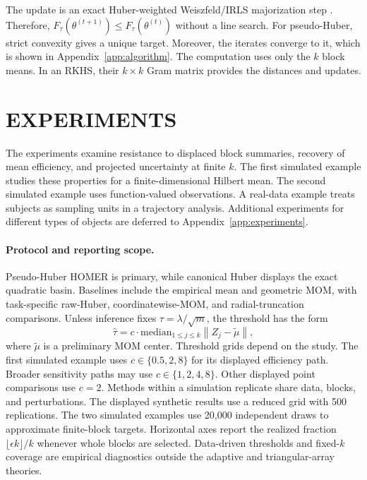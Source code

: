 \documentclass[twoside]{article}
\theoremstyle{definition}
\newcommand{\norm}[1]{\left\lVert #1\right\rVert}
\begin{document}
The update is an exact Huber-weighted Weiszfeld/IRLS majorization step \citep{beck_2015_WeiszfeldsMethodOld,cardot_2013_EfficientFastEstimation}. Therefore, $F_\tau(\theta^{(t+1)})\le F_\tau(\theta^{(t)})$ without a line search. For pseudo-Huber, strict convexity gives a unique target. Moreover, the iterates converge to it, which is shown in Appendix~\ref{app:algorithm}. The computation uses only the $k$ block means. In an RKHS, their $k\times k$ Gram matrix provides the distances and updates. 






\section{EXPERIMENTS}\label{sec:experiments}

The experiments examine resistance to displaced block summaries, recovery of mean efficiency, and projected uncertainty at finite $k$. The first simulated example studies these properties for a finite-dimensional Hilbert mean. The second simulated example uses function-valued observations. A real-data example treats subjects as sampling units in a trajectory analysis. Additional experiments for different types of objects are deferred to Appendix~\ref{app:experiments}.

\paragraph{Protocol and reporting scope.}
Pseudo-Huber HOMER is primary, while canonical Huber displays the exact quadratic basin. Baselines include the empirical mean and geometric MOM, with task-specific raw-Huber, coordinatewise-MOM, and radial-truncation comparisons. Unless inference fixes $\tau=\lambda/\sqrt m$, the threshold has the form
\[
    \hat\tau=c\cdot \mathrm{median}_{1\le j\le k}\norm{Z_j-\tilde\mu},
\]
where $\tilde\mu$ is a preliminary MOM center. Threshold grids depend on the study. The first simulated example uses $c\in\{0.5,2,8\}$ for its displayed efficiency path. Broader sensitivity paths may use $c\in\{1,2,4,8\}$. Other displayed point comparisons use $c=2$. Methods within a simulation replicate share data, blocks, and perturbations. The displayed synthetic results use a reduced grid with 500 replications. The two simulated examples use 20,000 independent draws to approximate finite-block targets. Horizontal axes report the realized fraction $\lfloor\epsilon k\rfloor/k$ whenever whole blocks are selected. Data-driven thresholds and fixed-$k$ coverage are empirical diagnostics outside the adaptive and triangular-array theories.
\end{document}
